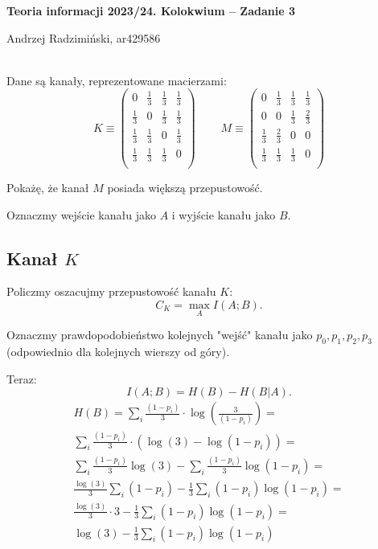 


\setlength{\parindent}{0pt}
\noindent

{\bf Teoria informacji 2023/24. Kolokwium -- Zadanie 3}

Andrzej Radzimiński, ar429586
\\

\ \\

\newcommand{\ot}{\frac{1}{3}}
\newcommand{\twt}{\frac{2}{3}}

\renewcommand*{\arraystretch}{1.5}

Dane są kanały, reprezentowane macierzami:
$$
K \equiv
\begin{pmatrix}
	0   & \ot & \ot & \ot \\
	\ot & 0   & \ot & \ot \\
	\ot & \ot & 0   & \ot \\
	\ot & \ot & \ot & 0   \\
\end{pmatrix}
\ \ \ \ \ \ \ \ \ \  
M \equiv 
\begin{pmatrix}
	0   & \ot & \ot & \ot \\
	0   & 0   & \ot & \twt \\
	\ot & \twt& 0   & 0  \\
	\ot & \ot & \ot & 0   \\
\end{pmatrix}
$$

Pokażę, że kanał $M$ posiada większą przepustowość.

Oznaczmy wejście kanału jako $A$ i wyjście kanału jako $B$.\\

\subsection*{Kanał $K$}

Policzmy oszacujmy przepustowość kanału $K$:
$$
	C_K = \max_{A} I(A; B).
$$

Oznaczmy prawdopodobieństwo kolejnych "wejść" kanału jako
$p_0, p_1, p_2, p_3$ (odpowiednio dla kolejnych wierszy od góry).

Teraz:
$$
	I(A; B) = H(B) - H(B | A).
$$
\begin{multline*}
	H(B) =
	\sum_{i} \frac{(1-p_{i})}{3} \cdot \log\left(\frac{3}{(1-p_{i})} \right) = \\
	\sum_{i} \frac{(1-p_{i})}{3} \cdot \left(\log(3) - \log(1-p_{i}) \right) = \\
	\sum_{i} \frac{(1-p_{i})}{3}\log(3) - \sum_{i} \frac{(1-p_{i})}{3}\log(1-p_{i}) = \\
	\frac{\log(3)}{3} \sum_{i} (1-p_{i}) - \frac{1}{3}\sum_{i} (1-p_{i})\log(1-p_{i}) = \\
	\frac{\log(3)}{3} \cdot 3 - \frac{1}{3}\sum_{i} (1-p_{i})\log(1-p_{i}) = \\
	\log(3) - \frac{1}{3}\sum_{i} (1-p_{i})\log(1-p_{i})
\end{multline*}

